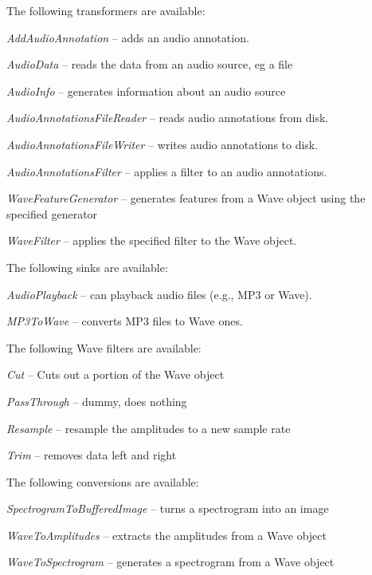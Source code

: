 \documentclass[a4paper]{book}
\begin{document}
\noindent The following transformers are available:
\begin{tight_itemize}
  \item \textit{AddAudioAnnotation} -- adds an audio annotation.
  \item \textit{AudioData} -- reads the data from an audio source, eg a file
  \item \textit{AudioInfo} -- generates information about an audio source
  \item \textit{AudioAnnotationsFileReader} -- reads audio annotations from disk.
  \item \textit{AudioAnnotationsFileWriter} -- writes audio annotations to disk.
  \item \textit{AudioAnnotationsFilter} -- applies a filter to an audio annotations.
  \item \textit{WaveFeatureGenerator} -- generates features from a Wave object
  using the specified generator
  \item \textit{WaveFilter} -- applies the specified filter to the Wave object.
\end{tight_itemize}

\noindent The following sinks are available:
\begin{tight_itemize}
  \item \textit{AudioPlayback} -- can playback audio files (e.g., MP3 or Wave).
  \item \textit{MP3ToWave} -- converts MP3 files to Wave ones.
\end{tight_itemize}

\noindent The following Wave filters are available:
\begin{tight_itemize}
  \item \textit{Cut} -- Cuts out a portion of the Wave object
  \item \textit{PassThrough} -- dummy, does nothing
  \item \textit{Resample} -- resample the amplitudes to a new sample rate
  \item \textit{Trim} -- removes data left and right
\end{tight_itemize}

\noindent The following conversions are available:
\begin{tight_itemize}
  \item \textit{SpectrogramToBufferedImage} -- turns a spectrogram into an image
  \item \textit{WaveToAmplitudes} -- extracts the amplitudes from a Wave object
  \item \textit{WaveToSpectrogram} -- generates a spectrogram from a Wave object
\end{tight_itemize}
\end{document}

